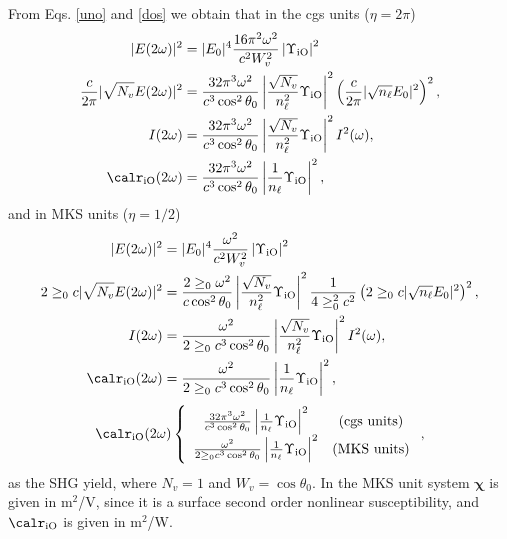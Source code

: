 From Eqs. \eqref{uno} and \eqref{dos} we obtain that
in the cgs units ($\eta=2\pi$)
\begin{align}\label{r01}
|E(2\omega)|^2 
&= |E_{0}|^4\frac{16\pi^{2}\omega^{2}}{c^{2}W^2_v}
\left\vert  
\Upsilon_{\mathrm{iO}}
\right\vert^{2}
\nonumber\\
\frac{c}{2\pi}|\sqrt{N_v}E(2\omega)|^{2} 
&=
\frac{32\pi^{3}\omega^{2}}{c^{3}\cos^2\theta_0}
\left\vert  
\frac{\sqrt{N_v}}{n^2_\ell}
\Upsilon_{\mathrm{iO}}
\right\vert^{2} 
\left(\frac{c}{2\pi}|\sqrt{n_\ell}E_{0}|^{2}\right)^{2},
\nonumber\\ 
I(2\omega) 
&= \frac{32\pi^{3}\omega^{2}}{c^{3}\cos^2\theta_0}
\left\vert  
\frac{\sqrt{N_v}}{n^2_\ell}
\Upsilon_{\mathrm{iO}}
\right\vert^{2}I^{2}(\omega),
\nonumber\\
\calr_{\mathrm{iO}}(2\omega) 
&= 
\frac{32\pi^{3}\omega^{2}}{c^{3}\cos^2\theta_0}
\left\vert  
\frac{1}{n_\ell}
\Upsilon_{\mathrm{iO}}
\right\vert^{2}
,
\end{align} 
and in MKS units ($\eta=1/2$)
\begin{align}\label{r01m}
|E(2\omega)|^2 
&= |E_{0}|^4
\frac{\omega^{2}}{c^{2}W^2_v}
\left\vert  
\Upsilon_{\mathrm{iO}}
\right\vert^{2}
\nonumber\\
2\ge_0c|\sqrt{N_v}E(2\omega)|^{2} 
&=
\frac{2\ge_0\omega^{2}}{c\cos^2\theta_0}
\left\vert  
\frac{\sqrt{N_v}}{n^2_\ell}
\Upsilon_{\mathrm{iO}}
\right\vert^{2} 
\frac{1}{4\ge^2_0c^2}\left(2\ge_0c|\sqrt{n_\ell}E_{0}|^{2}\right)^{2},
\nonumber\\ 
I(2\omega) 
&= 
\frac{\omega^{2}}{2\ge_0c^3\cos^2\theta_0}
\left\vert  
\frac{\sqrt{N_v}}{n^2_\ell}
\Upsilon_{\mathrm{iO}}
\right\vert^{2}I^{2}(\omega),
\nonumber\\
\calr_{\mathrm{iO}}(2\omega) 
&= \frac{\omega^{2}}{2\ge_0c^3\cos^2\theta_0}
\left\vert  
\frac{1}{n_\ell}
\Upsilon_{\mathrm{iO}}
\right\vert^{2} 
,
\end{align} 
\begin{equation}\label{mc6}
\calr_{\mathrm{iO}}(2\omega) 
\left\{
\begin{array}{cc} 
\frac{32\pi^{3}\omega^{2}}{c^{3}\cos^2\theta_0}
\left\vert  
\frac{1}{n_\ell}
\Upsilon_{\mathrm{iO}}
\right\vert^{2} 
& \text{(cgs units)} \\
\frac{\omega^{2}}{2\ge_0c^3\cos^2\theta_0}
\left\vert  
\frac{1}{n_\ell}
\Upsilon_{\mathrm{iO}}
\right\vert^{2} 
& \text{(MKS units)} 
\end{array}
\right.
,
\end{equation}
as the SHG yield, where $N_v=1$ and $W_v=\cos\theta_0$.
In the MKS unit system $\boldsymbol{\chi}$ is given in m$^2$/V, since
it is a surface second order nonlinear susceptibility, and
$\calr_{\mathrm{iO}}$ is given in m$^2$/W. 


